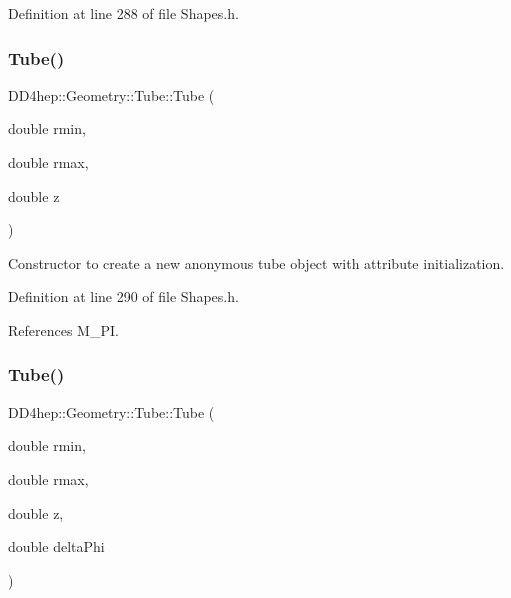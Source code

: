 Definition at line 288 of file Shapes.\+h.

\hypertarget{class_d_d4hep_1_1_geometry_1_1_tube_a8c7646c72431590ee08498dccd5db2cf}{}\label{class_d_d4hep_1_1_geometry_1_1_tube_a8c7646c72431590ee08498dccd5db2cf} 
\subsubsection{\texorpdfstring{Tube()}{Tube()}\hspace{0.1cm}{\footnotesize\ttfamily [5/10]}}
{\footnotesize\ttfamily D\+D4hep\+::\+Geometry\+::\+Tube\+::\+Tube (\begin{DoxyParamCaption}\item[{double}]{rmin,  }\item[{double}]{rmax,  }\item[{double}]{z }\end{DoxyParamCaption})\hspace{0.3cm}{\ttfamily [inline]}}



Constructor to create a new anonymous tube object with attribute initialization. 



Definition at line 290 of file Shapes.\+h.



References M\+\_\+\+PI.

\hypertarget{class_d_d4hep_1_1_geometry_1_1_tube_a27440d0dd4318c664ff4f3c4a36dd4f0}{}\label{class_d_d4hep_1_1_geometry_1_1_tube_a27440d0dd4318c664ff4f3c4a36dd4f0} 
\subsubsection{\texorpdfstring{Tube()}{Tube()}\hspace{0.1cm}{\footnotesize\ttfamily [6/10]}}
{\footnotesize\ttfamily D\+D4hep\+::\+Geometry\+::\+Tube\+::\+Tube (\begin{DoxyParamCaption}\item[{double}]{rmin,  }\item[{double}]{rmax,  }\item[{double}]{z,  }\item[{double}]{delta\+Phi }\end{DoxyParamCaption})\hspace{0.3cm}{\ttfamily [inline]}}




